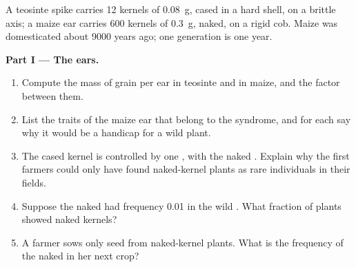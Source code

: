 \begin{problem}
\label{pb:g12:domesticated-plants:1}
A teosinte spike carries 12 kernels of \qty{0.08}{g}, cased in a hard
shell, on a brittle axis; a maize ear carries 600 kernels of
\qty{0.3}{g}, naked, on a rigid cob. Maize was domesticated about 9000
years ago; one generation is one year.

\medskip
\noindent\textbf{Part I --- The ears.}
\begin{enumerate}
  \item Compute the mass of grain per ear in teosinte and in maize,
        and the factor between them.
  \item List the traits of the maize ear that belong to the
         syndrome, and for each say why it would be a
        handicap for a wild plant.
  \item The cased kernel is controlled by one , with the naked
         . Explain why the first farmers could only
        have found naked-kernel plants as rare individuals in their
        fields.
  \item Suppose the naked  had frequency 0.01 in the wild
        . What fraction of plants showed naked kernels?
  \item A farmer sows only seed from naked-kernel plants. What is the
        frequency of the naked  in her next crop?
\end{enumerate}


\end{problem}
